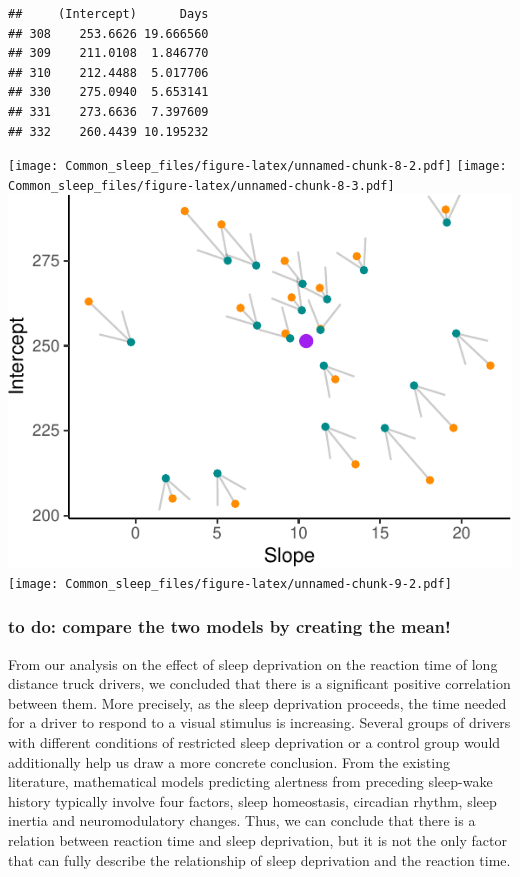 \documentclass[
]{article}
\begin{document}
\begin{verbatim}
##     (Intercept)      Days
## 308    253.6626 19.666560
## 309    211.0108  1.846770
## 310    212.4488  5.017706
## 330    275.0940  5.653141
## 331    273.6636  7.397609
## 332    260.4439 10.195232
\end{verbatim}

\texttt{[image: Common\_sleep\_files/figure-latex/unnamed-chunk-8-2.pdf]}
\texttt{[image: Common\_sleep\_files/figure-latex/unnamed-chunk-8-3.pdf]}
\includegraphics{Common_sleep_files/figure-latex/unnamed-chunk-9-1.pdf}
\texttt{[image: Common\_sleep\_files/figure-latex/unnamed-chunk-9-2.pdf]}

\hypertarget{to-do-compare-the-two-models-by-creating-the-mean}{%
\subsubsection{to do: compare the two models by creating the
mean!}\label{to-do-compare-the-two-models-by-creating-the-mean}}

From our analysis on the effect of sleep deprivation on the reaction
time of long distance truck drivers, we concluded that there is a
significant positive correlation between them. More precisely, as the
sleep deprivation proceeds, the time needed for a driver to respond to a
visual stimulus is increasing. Several groups of drivers with different
conditions of restricted sleep deprivation or a control group would
additionally help us draw a more concrete conclusion. From the existing
literature, mathematical models predicting alertness from preceding
sleep-wake history typically involve four factors, sleep homeostasis,
circadian rhythm, sleep inertia and neuromodulatory changes. Thus, we
can conclude that there is a relation between reaction time and sleep
deprivation, but it is not the only factor that can fully describe the
relationship of sleep deprivation and the reaction time.
\end{document}
